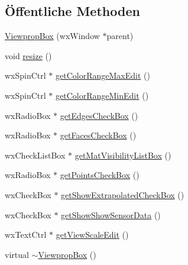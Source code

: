 \subsection*{Öffentliche Methoden}
\begin{DoxyCompactItemize}
\item 
\hyperlink{classViewpropBox_a4cac75d99079134622f57e35f1e47229}{Viewprop\-Box} (wx\-Window $\ast$parent)
\item 
void \hyperlink{classViewpropBox_a7f2732c6e7d24fc90fad55972cb1e759}{resize} ()
\item 
wx\-Spin\-Ctrl $\ast$ \hyperlink{classViewpropBox_a23832121cac9cb822438072152bfa252}{get\-Color\-Range\-Max\-Edit} ()
\item 
wx\-Spin\-Ctrl $\ast$ \hyperlink{classViewpropBox_a3f497c6cceef0c6db27adf56c53c9838}{get\-Color\-Range\-Min\-Edit} ()
\item 
wx\-Radio\-Box $\ast$ \hyperlink{classViewpropBox_a2798ca6ed2a570bde1ac13f74dee398c}{get\-Edges\-Check\-Box} ()
\item 
wx\-Radio\-Box $\ast$ \hyperlink{classViewpropBox_a3ebd07b7d8de74d639ea80181c8c7abc}{get\-Faces\-Check\-Box} ()
\item 
wx\-Check\-List\-Box $\ast$ \hyperlink{classViewpropBox_a3b9cdaefd86124fd67e821dfa0bbd3b8}{get\-Mat\-Visibility\-List\-Box} ()
\item 
wx\-Radio\-Box $\ast$ \hyperlink{classViewpropBox_a1b74032daa1c60624755396d7afc9d0d}{get\-Points\-Check\-Box} ()
\item 
wx\-Check\-Box $\ast$ \hyperlink{classViewpropBox_a3d3c4a809f14eca31ccf3858033eee7a}{get\-Show\-Extrapolated\-Check\-Box} ()
\item 
wx\-Check\-Box $\ast$ \hyperlink{classViewpropBox_ade722440c4b3c0da3feb78a590aa2946}{get\-Show\-Show\-Sensor\-Data} ()
\item 
wx\-Text\-Ctrl $\ast$ \hyperlink{classViewpropBox_a8ac6322e5dcdbbde1c646e1ccbf08ed9}{get\-View\-Scale\-Edit} ()
\item 
virtual \hyperlink{classViewpropBox_ab1c9234649b6a386b457d9ba5de311e4}{$\sim$\-Viewprop\-Box} ()
\end{DoxyCompactItemize}
